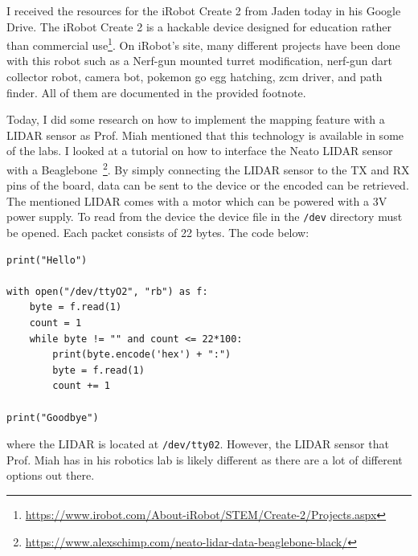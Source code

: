 \documentclass[fontsize=11pt, %
                             paper=a4, %
                             twoside, %
                             captions=tableheading,
                             index=totoc,
                             hyperref]{labbook}
\begin{document}
\begin{addmargin}[0cm]{0cm}
I received the resources for the iRobot Create 2 from Jaden today in his Google Drive. The iRobot Create 2 is a hackable device designed for education rather than commercial use\footnote{\url{https://www.irobot.com/About-iRobot/STEM/Create-2/Projects.aspx}}. On iRobot's site, many different projects have been done with this robot such as a Nerf-gun mounted turret modification, nerf-gun dart collector robot, camera bot, pokemon go egg hatching, zcm driver, and path finder. All of them are documented in the provided footnote.

Today, I did some research on how to implement the mapping feature with a LIDAR sensor as Prof. Miah mentioned that this technology is available in some of the labs. I looked at a tutorial on how to interface the Neato LIDAR sensor with a Beaglebone~\footnote{\url{https://www.alexschimp.com/neato-lidar-data-beaglebone-black/}}. By simply connecting the LIDAR sensor to the TX and RX pins of the board, data can be sent to the device or the encoded can be retrieved. The mentioned LIDAR comes with a motor which can be powered with a $3$V power supply. To read from the device the device file in the \texttt{/dev} directory must be opened. Each packet consists of 22 bytes. The code below:
\begin{Verbatim}
print("Hello")

with open("/dev/ttyO2", "rb") as f:
    byte = f.read(1)
    count = 1
    while byte != "" and count <= 22*100:
        print(byte.encode('hex') + ":")
        byte = f.read(1)
        count += 1

print("Goodbye")
\end{Verbatim}
where the LIDAR is located at \texttt{/dev/tty02}. However, the LIDAR sensor that Prof. Miah has in his robotics lab is likely different as there are a lot of different options out there.


\end{addmargin}
\end{document}
